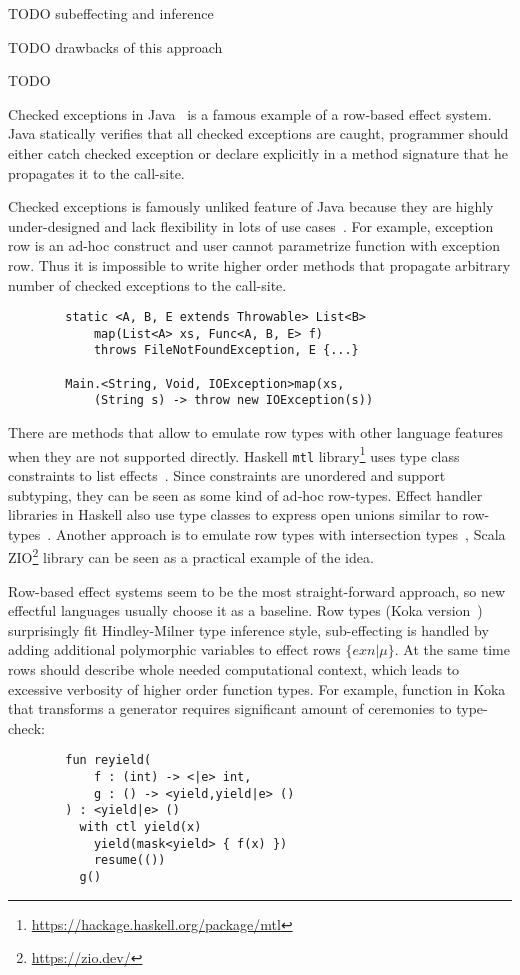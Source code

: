 \documentclass[conference]{IEEEtran}
\begin{document}
    TODO subeffecting and inference %

    TODO drawbacks of this approach %

    TODO~\cite{hillerstrom2016liberating} %

    Checked exceptions in Java~\cite{gosling2000java} is a famous example of a row-based effect system.
    Java statically verifies that all checked exceptions are caught, programmer should either catch checked exception or declare explicitly in a method signature that he propagates it to the call-site.

    Checked exceptions is famously unliked feature of Java because they are highly under-designed and lack flexibility in lots of use cases~\cite{checked-exceptions}.
    For example, exception row is an ad-hoc construct and user cannot parametrize function with exception row.
    Thus it is impossible to write higher order methods that propagate arbitrary number of checked exceptions to the call-site.

    \begin{verbatim}
        static <A, B, E extends Throwable> List<B>
            map(List<A> xs, Func<A, B, E> f)
            throws FileNotFoundException, E {...}

        Main.<String, Void, IOException>map(xs,
            (String s) -> throw new IOException(s))
    \end{verbatim}

    There are methods that allow to emulate row types with other language features when they are not supported directly.
    Haskell \texttt{mtl} library\footnote{\url{https://hackage.haskell.org/package/mtl}} uses type class constraints to list effects~\cite{jones1995functional}.
    Since constraints are unordered and support subtyping, they can be seen as some kind of ad-hoc row-types.
    Effect handler libraries in Haskell also use type classes to express open unions similar to row-types~\cite{swierstra2008data}.
    Another approach is to emulate row types with intersection types~\cite{xie2020row}, Scala ZIO\footnote{\url{https://zio.dev/}} library can be seen as a practical example of the idea.


    Row-based effect systems seem to be the most straight-forward approach, so new effectful languages usually choose it as a baseline.
    Row types (Koka version~\cite{leijen2014koka, leijen2017type}) surprisingly fit Hindley-Milner type inference style, sub-effecting is handled by adding additional polymorphic variables to effect rows $\{exn|\mu\}$.
    At the same time rows should describe whole needed computational context, which leads to excessive verbosity of higher order function types.
    For example, function in Koka that transforms a generator requires significant amount of ceremonies to type-check:
    \begin{verbatim}
        fun reyield(
            f : (int) -> <|e> int,
            g : () -> <yield,yield|e> ()
        ) : <yield|e> ()
          with ctl yield(x)
            yield(mask<yield> { f(x) })
            resume(())
          g()
    \end{verbatim}
\end{document}
